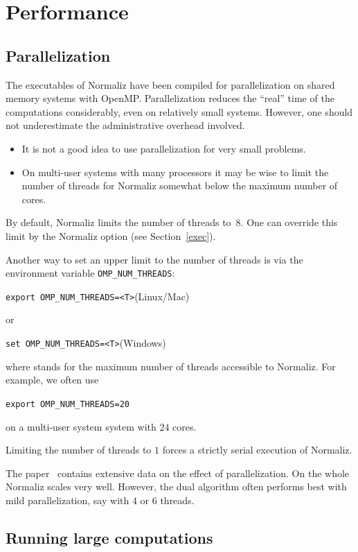\section{Performance}\label{Perf}

\subsection{Parallelization}\label{PerfPar}

The executables of Normaliz have been compiled for parallelization
on shared memory systems with OpenMP. Parallelization reduces the
``real'' time of the computations considerably, even on relatively
small systems. However, one should not underestimate the
administrative overhead involved.
\begin{itemize}
	\item It is not a good idea to use parallelization for very small problems.
	\item On multi-user systems with many processors it may be wise to limit
	the number of threads for Normaliz somewhat below the maximum
	number of cores.
\end{itemize}
By default, Normaliz limits the number of threads to~$8$. One can override this limit by the Normaliz
option  (see Section~\ref{exec}).

Another way to set an upper limit to the number of threads is via the environment variable \verb|OMP_NUM_THREADS|:
\begin{center}
	\verb+export OMP_NUM_THREADS=<T>+\qquad (Linux/Mac)
\end{center}
or
\begin{center}
	\verb+set OMP_NUM_THREADS=<T>+\qquad (Windows)
\end{center}
where  stands for the maximum number of threads
accessible to Normaliz. For example, we often use
\begin{center}
	\verb+export OMP_NUM_THREADS=20+
\end{center}
on a multi-user system system with $24$ cores.

Limiting the number of threads to $1$ forces a strictly serial
execution of Normaliz.

The paper~\cite{BIS} contains extensive data on the effect of parallelization. On the whole Normaliz scales very well.
However, the dual algorithm often performs best with mild parallelization, say with $4$ or $6$ threads.

\subsection{Running large computations}\label{Large}

